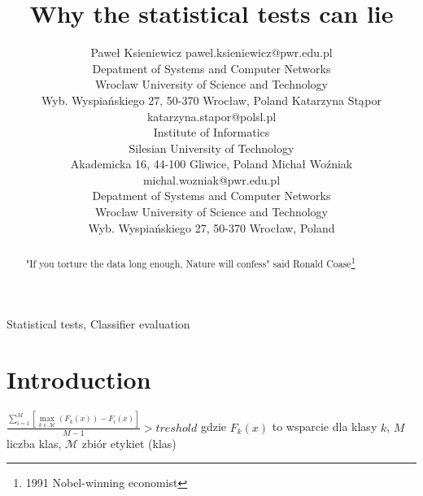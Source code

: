 \documentclass[twoside,11pt]{article}
\begin{document}
\title{Why the statistical tests can lie}

\author{
\name Pawe\l{} Ksieniewicz \email pawel.ksieniewicz@pwr.edu.pl\\
       \addr Depatment of Systems and Computer Networks\\
       Wroclaw University of Science and Technology\\
       Wyb. Wyspia\'nskiego 27, 50-370 Wroc\l{}aw, Poland
       \AND
\name Katarzyna St\k{a}por \email katarzyna.stapor@polsl.pl \\
       \addr Institute of Informatics\\
       Silesian University of Technology\\
       Akademicka 16, 44-100 Gliwice, Poland
       \AND
       \name Micha\l{} Wo\'zniak \email michal.wozniak@pwr.edu.pl \\
       \addr Depatment of Systems and Computer Networks\\
       Wroclaw University of Science and Technology\\
       Wyb. Wyspia\'nskiego 27, 50-370 Wroc\l{}aw, Poland}


\maketitle

\begin{abstract}%
"If you torture the data long enough, Nature will confess" said Ronald Coase\footnote{1991 Nobel-winning 
economist} \end{abstract}

\begin{keywords}
  Statistical tests, Classifier evaluation\end{keywords}

\section{Introduction}

$\frac{\mathop{\sum}\limits_{i=1}^M\left[\mathop{\max}\limits_{k \in \mathcal{M}}(F_k(x))-F_i(x)\right]}{M-1}>treshold$
gdzie $F_k(x)$ to wsparcie dla klasy $k$, $M$ liczba klas, $\mathcal{M}$  zbiór etykiet (klas)


\end{document}
